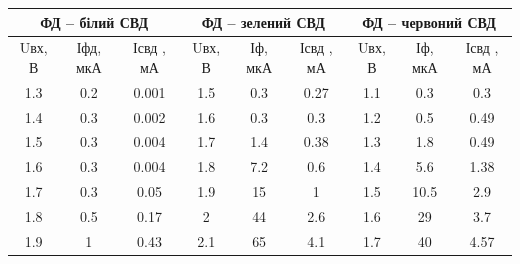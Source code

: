 \documentclass[a4paper,14pt]{extreport}
\begin{document}
\begin{landscape}
\begin{table}[]
\begin{tabular}{|ccc|ccc|ccc|}
\hline
\multicolumn{3}{|c|}{ФД – білий СВД}                                     & \multicolumn{3}{c|}{ФД – зелений СВД}                                  & \multicolumn{3}{c|}{ФД – червоний СВД}                                 \\ \hline
\multicolumn{1}{|c|}{Uвх, В} & \multicolumn{1}{c|}{Іфд, мкА} & Ісвд , мА & \multicolumn{1}{c|}{Uвх, В} & \multicolumn{1}{c|}{Іф, мкА} & Ісвд , мА & \multicolumn{1}{c|}{Uвх, В} & \multicolumn{1}{c|}{Іф, мкА} & Ісвд , мА \\ \hline
\multicolumn{1}{|c|}{1.3}    & \multicolumn{1}{c|}{0.2}      & 0.001     & \multicolumn{1}{c|}{1.5}    & \multicolumn{1}{c|}{0.3}     & 0.27      & \multicolumn{1}{c|}{1.1}    & \multicolumn{1}{c|}{0.3}     & 0.3       \\ \hline
\multicolumn{1}{|c|}{1.4}    & \multicolumn{1}{c|}{0.3}      & 0.002     & \multicolumn{1}{c|}{1.6}    & \multicolumn{1}{c|}{0.3}     & 0.3       & \multicolumn{1}{c|}{1.2}    & \multicolumn{1}{c|}{0.5}     & 0.49      \\ \hline
\multicolumn{1}{|c|}{1.5}    & \multicolumn{1}{c|}{0.3}      & 0.004     & \multicolumn{1}{c|}{1.7}    & \multicolumn{1}{c|}{1.4}     & 0.38      & \multicolumn{1}{c|}{1.3}    & \multicolumn{1}{c|}{1.8}     & 0.49      \\ \hline
\multicolumn{1}{|c|}{1.6}    & \multicolumn{1}{c|}{0.3}      & 0.004     & \multicolumn{1}{c|}{1.8}    & \multicolumn{1}{c|}{7.2}     & 0.6       & \multicolumn{1}{c|}{1.4}    & \multicolumn{1}{c|}{5.6}     & 1.38      \\ \hline
\multicolumn{1}{|c|}{1.7}    & \multicolumn{1}{c|}{0.3}      & 0.05      & \multicolumn{1}{c|}{1.9}    & \multicolumn{1}{c|}{15}      & 1         & \multicolumn{1}{c|}{1.5}    & \multicolumn{1}{c|}{10.5}    & 2.9       \\ \hline
\multicolumn{1}{|c|}{1.8}    & \multicolumn{1}{c|}{0.5}      & 0.17      & \multicolumn{1}{c|}{2}      & \multicolumn{1}{c|}{44}      & 2.6       & \multicolumn{1}{c|}{1.6}    & \multicolumn{1}{c|}{29}      & 3.7       \\ \hline
\multicolumn{1}{|c|}{1.9}    & \multicolumn{1}{c|}{1}        & 0.43      & \multicolumn{1}{c|}{2.1}    & \multicolumn{1}{c|}{65}      & 4.1       & \multicolumn{1}{c|}{1.7}    & \multicolumn{1}{c|}{40}      & 4.57      \\ \hline

\end{tabular}
\end{table}
\end{landscape}
\end{document}
